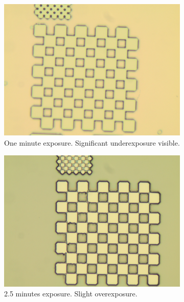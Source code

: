 \begin{figure}[!b]
    \centering
    \begin{subfigure}[t]{0.3\linewidth}
        \centering
        \includegraphics[width=\textwidth]{data/b3d1.jpg}
        \caption{One minute exposure. Significant underexposure visible.}
        \label{fig:b3d1}
    \end{subfigure}
    \hfill
    \begin{subfigure}[t]{0.3\linewidth}
        \centering
        \includegraphics[width=\textwidth]{data/b3e1.jpg}
        \caption{2.5 minutes exposure. Slight overexposure.}
        \label{fig:b3e1}
    \end{subfigure}
    \hfill
    \begin{subfigure}[t]{0.3\linewidth}

\end{subfigure}
\end{figure}
